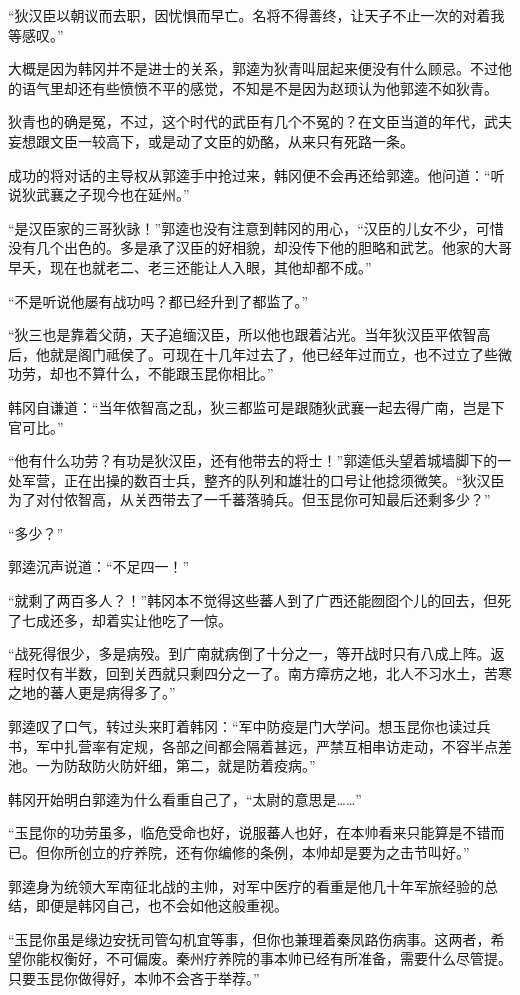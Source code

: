 “狄汉臣以朝议而去职，因忧惧而早亡。名将不得善终，让天子不止一次的对着我等感叹。”

大概是因为韩冈并不是进士的关系，郭逵为狄青叫屈起来便没有什么顾忌。不过他的语气里却还有些愤愤不平的感觉，不知是不是因为赵顼认为他郭逵不如狄青。

狄青也的确是冤，不过，这个时代的武臣有几个不冤的？在文臣当道的年代，武夫妄想跟文臣一较高下，或是动了文臣的奶酪，从来只有死路一条。

成功的将对话的主导权从郭逵手中抢过来，韩冈便不会再还给郭逵。他问道：“听说狄武襄之子现今也在延州。”

“是汉臣家的三哥狄詠！”郭逵也没有注意到韩冈的用心，“汉臣的儿女不少，可惜没有几个出色的。多是承了汉臣的好相貌，却没传下他的胆略和武艺。他家的大哥早夭，现在也就老二、老三还能让人入眼，其他却都不成。”

“不是听说他屡有战功吗？都已经升到了都监了。”

“狄三也是靠着父荫，天子追缅汉臣，所以他也跟着沾光。当年狄汉臣平侬智高后，他就是阁门祗侯了。可现在十几年过去了，他已经年过而立，也不过立了些微功劳，却也不算什么，不能跟玉昆你相比。”

韩冈自谦道：“当年侬智高之乱，狄三都监可是跟随狄武襄一起去得广南，岂是下官可比。”

“他有什么功劳？有功是狄汉臣，还有他带去的将士！”郭逵低头望着城墙脚下的一处军营，正在出操的数百士兵，整齐的队列和雄壮的口号让他捻须微笑。“狄汉臣为了对付侬智高，从关西带去了一千蕃落骑兵。但玉昆你可知最后还剩多少？”

“多少？”

郭逵沉声说道：“不足四一！”

“就剩了两百多人？！”韩冈本不觉得这些蕃人到了广西还能囫囵个儿的回去，但死了七成还多，却着实让他吃了一惊。

“战死得很少，多是病殁。到广南就病倒了十分之一，等开战时只有八成上阵。返程时仅有半数，回到关西就只剩四分之一了。南方瘴疠之地，北人不习水土，苦寒之地的蕃人更是病得多了。”

郭逵叹了口气，转过头来盯着韩冈：“军中防疫是门大学问。想玉昆你也读过兵书，军中扎营率有定规，各部之间都会隔着甚远，严禁互相串访走动，不容半点差池。一为防敌防火防奸细，第二，就是防着疫病。”

韩冈开始明白郭逵为什么看重自己了，“太尉的意思是……”

“玉昆你的功劳虽多，临危受命也好，说服蕃人也好，在本帅看来只能算是不错而已。但你所创立的疗养院，还有你编修的条例，本帅却是要为之击节叫好。”

郭逵身为统领大军南征北战的主帅，对军中医疗的看重是他几十年军旅经验的总结，即便是韩冈自己，也不会如他这般重视。

“玉昆你虽是缘边安抚司管勾机宜等事，但你也兼理着秦凤路伤病事。这两者，希望你能权衡好，不可偏废。秦州疗养院的事本帅已经有所准备，需要什么尽管提。只要玉昆你做得好，本帅不会吝于举荐。”

